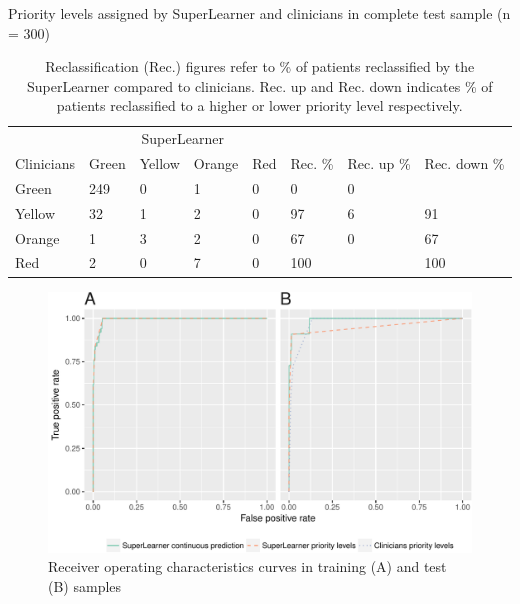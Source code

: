 \documentclass[10pt,letterpaper]{article}\usepackage[]{graphicx}\usepackage[]{color}
\begin{document}
\begin{table}[ht]
\centering
\caption{Priority levels assigned by SuperLearner and clinicians in complete test sample (n = 300)} 
\label{tab:reclass_all}
\begin{tabular}{llllllll}
  \hline
  & \multicolumn{4}{c}{SuperLearner} \\
 Clinicians & Green & Yellow & Orange & Red & Rec. \% & Rec. up \% & Rec. down \% \\
 \hline
Green & 249 & 0 & 1 & 0 & 0 & 0 &  \\ 
  Yellow & 32 & 1 & 2 & 0 & 97 & 6 & 91 \\ 
  Orange & 1 & 3 & 2 & 0 & 67 & 0 & 67 \\ 
  Red & 2 & 0 & 7 & 0 & 100 &  & 100 \\ 
   \hline
\end{tabular}
\caption*{Reclassification (Rec.) figures refer to \% of patients reclassified by the SuperLearner compared to clinicians. Rec. up and Rec. down indicates \% of patients reclassified to a higher or lower priority level respectively.} 
\end{table}


\begin{figure}
  \caption{Receiver operating characteristics curves in training (A) and test
    (B) samples}
  \label{fig:roc_plot}
  \includegraphics[width=\textwidth]{roc_plot.pdf}
\end{figure}
\end{document}
